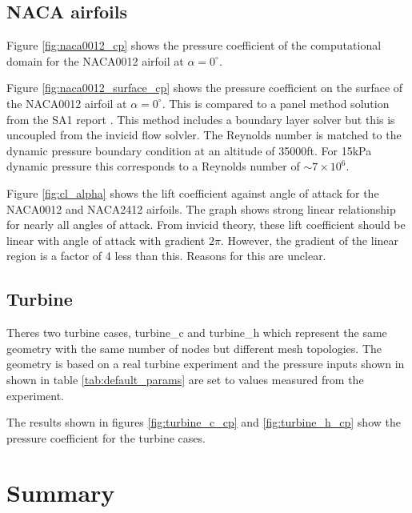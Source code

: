 \documentclass{article}
\begin{document}
\subsection{NACA airfoils}

Figure \ref{fig:naca0012_cp} shows the pressure coefficient of the computational domain for the NACA0012 airfoil at $\alpha = 0^\circ$.

Figure \ref{fig:naca0012_surface_cp} shows the pressure coefficient on the surface of the NACA0012 airfoil at $\alpha = 0^\circ$.
This is compared to a panel method solution from the SA1 report \cite{SA1}.
This method includes a boundary layer solver but this is uncoupled from the invicid flow solvler.
The Reynolds number is matched to the dynamic pressure boundary condition at an altitude of 35000ft.
For 15kPa dynamic pressure this corresponds to a Reynolds number of $\sim7\times10^6$.


Figure \ref{fig:cl_alpha} shows the lift coefficient against angle of attack for the NACA0012 and NACA2412 airfoils.
The graph shows strong linear relationship for nearly all angles of attack.
From invicid theory, these lift coefficient should be linear with angle of attack with gradient $ 2\pi $.
However, the gradient of the linear region is a factor of 4 less than this.
Reasons for this are unclear.




\subsection{Turbine}

Theres two turbine cases, turbine\_c and turbine\_h which represent the same geometry with the same number of nodes but different mesh topologies.
The geometry is based on a real turbine experiment \cite{4A3_lab} and the pressure inputs shown in shown in table \ref{tab:default_params} are set to values measured from the experiment. 

The results shown in figures \ref{fig:turbine_c_cp} and \ref{fig:turbine_h_cp} show the pressure coefficient for the turbine cases.


\section{Summary}
\end{document}
